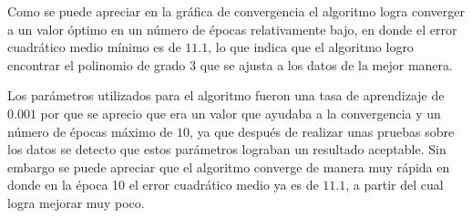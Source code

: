 \documentclass{article}
\theoremstyle{mytheoremstyle}
\theoremstyle{mytheoremstyle}
\theoremstyle{myproblemstyle}
\begin{document}
Como se puede apreciar en la gráfica de convergencia el algoritmo logra converger a un valor óptimo en un número de épocas relativamente bajo, en donde el error cuadrático medio mínimo es de $11.1$, lo que indica que el algoritmo logro encontrar el polinomio de grado 3 que se ajusta a los datos de la mejor manera.

Los parámetros utilizados para el algoritmo fueron una tasa de aprendizaje de $0.001$ por que se aprecio que era un valor que ayudaba a la convergencia y un número de épocas máximo de $10$, ya que después de realizar unas pruebas sobre los datos se detecto que estos parámetros lograban un resultado aceptable. Sin embargo se puede apreciar que el algoritmo converge de manera muy rápida en donde en la época 10 el error cuadrático medio ya es de $11.1$, a partir del cual logra mejorar muy poco.
\end{document}
